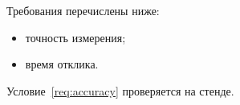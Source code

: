 Требования перечислены ниже:
\begin{itemize}
  \item точность измерения\label{req:accuracy}; %
  \item время отклика.
\end{itemize}

Условие~\ref{req:accuracy} проверяется на стенде.
